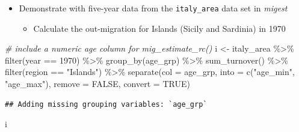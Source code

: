 \documentclass[
]{book}
\newenvironment{Shaded}{\begin{snugshade}}{\end{snugshade}}
\newcommand{\AttributeTok}[1]{\textcolor[rgb]{0.77,0.63,0.00}{#1}}
\newcommand{\CommentTok}[1]{\textcolor[rgb]{0.56,0.35,0.01}{\textit{#1}}}
\newcommand{\ConstantTok}[1]{\textcolor[rgb]{0.00,0.00,0.00}{#1}}
\newcommand{\DecValTok}[1]{\textcolor[rgb]{0.00,0.00,0.81}{#1}}
\newcommand{\FunctionTok}[1]{\textcolor[rgb]{0.00,0.00,0.00}{#1}}
\newcommand{\NormalTok}[1]{#1}
\newcommand{\OtherTok}[1]{\textcolor[rgb]{0.56,0.35,0.01}{#1}}
\newcommand{\SpecialCharTok}[1]{\textcolor[rgb]{0.00,0.00,0.00}{#1}}
\newcommand{\StringTok}[1]{\textcolor[rgb]{0.31,0.60,0.02}{#1}}
\providecommand{\tightlist}{%
  \setlength{\itemsep}{0pt}\setlength{\parskip}{0pt}}
\begin{document}
\begin{itemize}
\tightlist
\item
  Demonstrate with five-year data from the \texttt{italy\_area} data set in \emph{migest}

  \begin{itemize}
  \tightlist
  \item
    Calculate the out-migration for Islands (Sicily and Sardinia) in 1970
  \end{itemize}
\end{itemize}

\begin{Shaded}
\begin{Highlighting}[]
\CommentTok{\# include a numeric age column for mig\_estimate\_rc()}
\NormalTok{i }\OtherTok{\textless{}{-}}\NormalTok{ italy\_area }\SpecialCharTok{\%\textgreater{}\%}
  \FunctionTok{filter}\NormalTok{(year }\SpecialCharTok{==} \DecValTok{1970}\NormalTok{) }\SpecialCharTok{\%\textgreater{}\%}
  \FunctionTok{group\_by}\NormalTok{(age\_grp) }\SpecialCharTok{\%\textgreater{}\%}
  \FunctionTok{sum\_turnover}\NormalTok{() }\SpecialCharTok{\%\textgreater{}\%}
  \FunctionTok{filter}\NormalTok{(region }\SpecialCharTok{==} \StringTok{"Islands"}\NormalTok{) }\SpecialCharTok{\%\textgreater{}\%}
  \FunctionTok{separate}\NormalTok{(}\AttributeTok{col =}\NormalTok{ age\_grp, }\AttributeTok{into =} \FunctionTok{c}\NormalTok{(}\StringTok{"age\_min"}\NormalTok{, }\StringTok{"age\_max"}\NormalTok{), }
           \AttributeTok{remove =} \ConstantTok{FALSE}\NormalTok{, }\AttributeTok{convert =} \ConstantTok{TRUE}\NormalTok{)}
\end{Highlighting}
\end{Shaded}

\begin{verbatim}
## Adding missing grouping variables: `age_grp`
\end{verbatim}

\begin{Shaded}
\begin{Highlighting}[]
\NormalTok{i}
\end{Highlighting}
\end{Shaded}
\end{document}
